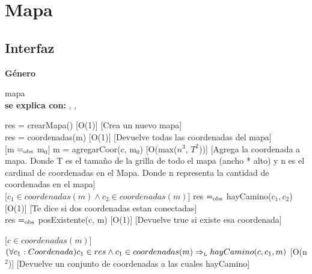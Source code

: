 \section{Mapa}


\subsection{Interfaz}

\parbox {1,7cm}{{\bf Género}} mapa\\
{\bf se explica con:}  , , \\
\medskip

{res = crearMapa()}
[O(1)]
[Crea un nuevo mapa]
\\

{res = coordenadas(m)}
[O(1)]
[Devuelve todas las coordenadas del mapa]
\\

[m $=_{\mathrm{obs}}$ m$_0$]
{m = agregarCoor(c, m$_0$)}
[O(max($n^3$, $T^2$))]
[Agrega la coordenada a mapa. Donde T es el tama\~no de la grilla de todo el mapa (ancho * alto) y n es el cardinal de coordenadas en el Mapa. Donde n representa la cantidad de coordenadas en el mapa]
\\

[$c_1 \in coordenadas(m) \wedge c_2 \in coordenadas(m)$]
{res $=_{\mathrm{obs}}$ hayCamino($c_1, c_2$)}
[O(1)]
[Te dice si dos coordenadas estan conectadas]
\\


{res $=_{\mathrm{obs}}$ posExistente(c, m)}
[O(1)]
[Devuelve true si existe esa coordenada]
\\


[$c \in coordenadas(m)$]
{$(\forall c_1: Coordenada) c_1 \in res \wedge c_1 \in coordenadas(m) \Rightarrow_{\mathrm{\scriptscriptstyle{L}}} hayCamino(c, c_1, m)$}
[O(n$^2$)]
[Devuelve un conjunto de coordenadas a las cuales hayCamino]
\\


